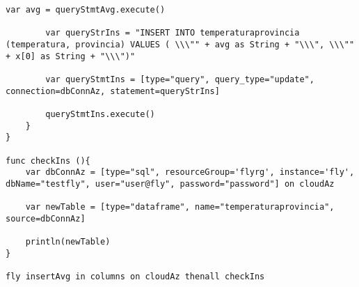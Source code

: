 \begin{lstlisting}[language=FLY,caption={Calcolo della temperatura media delle province della Campania su Azure utilizzando funzioni Serverless in JavaScript.}, label={lst:dbInteraction}]
        var avg = queryStmtAvg.execute()
        
        var queryStrIns = "INSERT INTO temperaturaprovincia (temperatura, provincia) VALUES ( \\\"" + avg as String + "\\\", \\\"" + x[0] as String + "\\\")"
        
        var queryStmtIns = [type="query", query_type="update", connection=dbConnAz, statement=queryStrIns]
        
        queryStmtIns.execute()
    }
}

func checkIns (){  
    var dbConnAz = [type="sql", resourceGroup='flyrg', instance='fly', dbName="testfly", user="user@fly", password="password"] on cloudAz
    
    var newTable = [type="dataframe", name="temperaturaprovincia", source=dbConnAz]
    
    println(newTable)
}

fly insertAvg in columns on cloudAz thenall checkIns
\end{lstlisting}